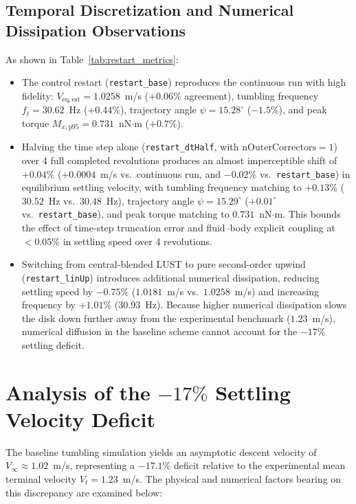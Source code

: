 \documentclass[11pt,a4paper]{article}
\begin{document}
\subsection{Temporal Discretization and Numerical Dissipation Observations}
As shown in Table~\ref{tab:restart_metrics}:
\begin{itemize}
    \item The control restart (\texttt{restart\_base}) reproduces the continuous run with high fidelity: $V_{\mathrm{eq,est}} = 1.0258$~m/s ($+0.06\%$ agreement), tumbling frequency $f_t = 30.62$~Hz ($+0.44\%$), trajectory angle $\psi = 15.28^\circ$ ($-1.5\%$), and peak torque $M_{x,\mathrm{p95}} = 0.731$~nN$\cdot$m ($+0.7\%$).
    \item Halving the time step alone (\texttt{restart\_dtHalf}, with $\mathrm{nOuterCorrectors} = 1$) over 4 full completed revolutions produces an almost imperceptible shift of $\mathbf{+0.04\%}$ ($+0.0004$~m/s vs.\ continuous run, and $-0.02\%$ vs.\ \texttt{restart\_base}) in equilibrium settling velocity, with tumbling frequency matching to $+0.13\%$ ($30.52$~Hz vs.\ $30.48$~Hz), trajectory angle $\psi = 15.29^\circ$ ($+0.01^\circ$ vs.\ \texttt{restart\_base}), and peak torque matching to $0.731$~nN$\cdot$m. This bounds the effect of time-step truncation error and fluid--body explicit coupling at $< 0.05\%$ in settling speed over 4 revolutions.
    \item Switching from central-blended LUST to pure second-order upwind (\texttt{restart\_linUp}) introduces additional numerical dissipation, reducing settling speed by $\mathbf{-0.75\%}$ ($1.0181$~m/s vs.\ $1.0258$~m/s) and increasing frequency by $+1.01\%$ ($30.93$~Hz). Because higher numerical dissipation slows the disk down further away from the experimental benchmark ($1.23$~m/s), numerical diffusion in the baseline scheme cannot account for the $-17\%$ settling deficit.
\end{itemize}

\section{Analysis of the \texorpdfstring{$-17\%$}{-17\%} Settling Velocity Deficit}

The baseline tumbling simulation yields an asymptotic descent velocity of $V_\infty \approx 1.02$~m/s, representing a $-17.1\%$ deficit relative to the experimental mean terminal velocity $V_t = 1.23$~m/s. The physical and numerical factors bearing on this discrepancy are examined below:
\end{document}
